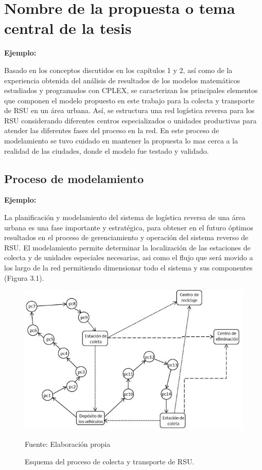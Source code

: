 \chapter{Nombre de la propuesta o tema central de la tesis}

{\bf Ejemplo:}\par

Basado en los conceptos discutidos en los capítulos 1 y 2, así como de la experiencia obtenida del análisis de resultados de los modelos matemáticos estudiados y programados con CPLEX, se caracterizan los principales elementos que componen el modelo propuesto en este trabajo para la colecta y transporte de RSU en un área urbana. Así, se estructura una red logística reversa para los RSU considerando diferentes centros especializados o unidades  productivas para atender las diferentes fases del proceso en la red. En este proceso de modelamiento se tuvo cuidado en mantener la propuesta lo mas cerca a la realidad de las ciudades, donde el modelo fue testado y validado.

\section{Proceso de modelamiento} 

{\bf Ejemplo:}\par

La planificación y modelamiento del sistema de logística reversa de una área urbana es una fase importante y estratégica, para obtener en el futuro óptimos resultados en el proceso de gerenciamiento y operación del sistema reverso de RSU. El modelamiento permite determinar la localización de las estaciones de colecta y de unidades especiales necesarias, asi como el flujo que será movido a los largo de la red permitiendo dimensionar todo el sistema y sus componentes (Figura 3.1).
\vskip 0.3cm
\begin{figure}[ht]
\begin{center}
\includegraphics[width=.6\textwidth]{Figura3}
\end{center}
\begin{center}
\vskip -0.5cm
\caption{\small{Esquema del proceso de colecta y transporte de RSU.}}
{\small{Fuente: Elaboración propia}}
\end{center}
\end{figure}

